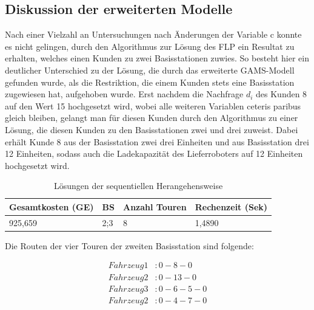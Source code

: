 \documentclass[a4paper,12pt,parskip,bibtotoc,liststotoc]{article}
\begin{document}
\subsection{Diskussion der erweiterten Modelle}

Nach einer Vielzahl an Untersuchungen nach Änderungen der Variable c konnte es nicht gelingen, durch den Algorithmus zur Lösung des FLP ein Resultat zu erhalten, welches einen Kunden zu zwei Basisstationen zuwies.
So besteht hier ein deutlicher Unterschied zu der Lösung, die durch das erweiterte GAMS-Modell gefunden wurde, als die Restriktion, die einem Kunden stets eine Basisstation zugewiesen hat, aufgehoben wurde.
Erst nachdem die Nachfrage $d_{i}$ des Kunden 8 auf den Wert 15 hochgesetzt wird, wobei alle weiteren Variablen ceteris paribus gleich bleiben, gelangt man für diesen Kunden durch den Algorithmus zu einer Lösung, die diesen Kunden zu den Basisstationen zwei und drei zuweist.
Dabei erhält Kunde 8 aus der Basisstation zwei drei Einheiten und aus Basisstation drei 12 Einheiten, sodass auch die Ladekapazität des Lieferroboters auf 12 Einheiten hochgesetzt wird.


\begin{table}[h!]
    \vspace*{-3mm}
    \hspace*{2mm}
  \renewcommand{\arraystretch}{1,5}
  \caption{Lösungen der sequentiellen Herangehensweise
  }
  \begin{center}
 
    \begin{tabular}{|l|l|l|l|} \hline
    \textbf{Gesamtkosten (GE)} &\textbf{BS} &\textbf{Anzahl Touren}&\textbf{ Rechenzeit} (Sek)\\\hline
     925,659 & 2;3 & 8 & 1,4890\\\hline   
	\end{tabular}
	  \end{center}
\end{table}


Die Routen der vier Touren der zweiten Basisstation sind folgende: 

\begin{equation} \label{eq:test}
    \begin{aligned} 
         Fahrzeug 1&: 0 - 8 - 0 \\
        Fahrzeug 2&: 0 - 13 - 0\\
        Fahrzeug 3&: 0 - 6 - 5 - 0\\
        Fahrzeug 2&: 0 - 4 - 7 - 0\\
    \end{aligned}
\end{equation}\\
\end{document}
